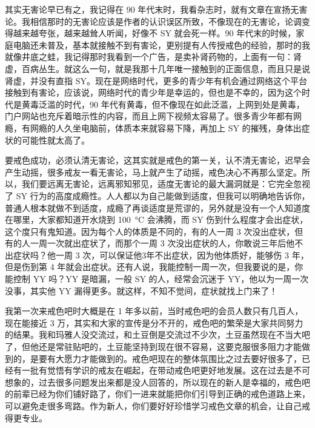 \documentclass[fontset=founder]{ctexart}
\begin{document}
其实无害论早已有之，我记得在 90 年代末时，我看杂志时，就有文章在宣扬无害论。我相信那时的无害论应该是作者的认识误区所致，不像现在的无害论，论调变得越来越夸张，越来越耸人听闻，好像不 SY 就会死一样。90 年代末的时候，家庭电脑还未普及，基本就接触不到有害论，更别提有人传授戒色的经验，那时的我就像井底之蛙，我记得那时我看到一个广告，是卖补肾药物的，上面有一句：肾虚，百病丛生。就这么一句，就是我那十几年唯一接触到的正面信息，而且只是说肾虚，并没有直指 SY。现在是网络时代，更多的青少年有机会通过网络这个平台接触到有害论，应该说，网络时代的青少年是幸运的，但也是不幸的，因为这个时代是黄毒泛滥的时代，90 年代有黄毒，但不像现在如此泛滥，上网到处是黄毒，门户网站也充斥着暗示性的内容，而且上网下视频太容易了。很多青少年都有网瘾，有网瘾的人久坐电脑前，体质本来就容易下降，再加上 SY 的摧残，身体出症状的可能性就太高了。

要戒色成功，必须认清无害论，这其实就是戒色的第一关，认不清无害论，迟早会产生动摇，很多戒友一看无害论，马上就产生了动摇，戒色决心不再那么坚定。所以，我们要远离无害论，远离邪知邪见，适度无害论的最大漏洞就是：它完全忽视了 SY 行为的高度成瘾性。人人都以为自己能做到适度，但我可以明确地告诉你，普通人根本就做不到适度，成瘾了再谈适度是荒谬的，另外就是没有一个人知道度在哪里，大家都知道开水烧到 \SI{100}{\degreeCelsius} 会沸腾，而 SY 伤到什么程度才会出症状，这个度只有鬼知道。因为每个人的体质是不同的，有的人一周 3 次没出症状，但有的人一周一次就出症状了，而那个一周 3 次没出症状的人，你敢说三年后他不出症状吗？他一周 3 次，可以保证他3年不出症状，因为他体质好，能够伤 3 年，但是伤到第 4 年就会出症状。还有人说，我能控制一周一次，但我要说的是，你能控制 YY 吗？YY 是暗漏，一般 SY 的人，经常会沉迷于 YY，他以为一周一次没事，其实他 YY 漏得更多。就这样，不知不觉间，症状就找上门来了！

我第一次来戒色吧时大概是在 1 年多以前，当时戒色吧的会员人数只有几百人，现在能接近 3 万，其实和大家的宣传是分不开的，戒色吧的繁荣是大家共同努力的结果。我和玛雅人没交流过，和土豆倒是交流过不少次，土豆虽然现在不当大吧了，但他还是常驻贴吧的，土豆能坚持到现在很不容易，这要克服很多阻力才能做到的，是要有大愿力才能做到的。戒色吧现在的整体氛围比之过去要好很多了，已经有一批有觉悟有学识的戒友在崛起，在带动戒色吧更好地发展。这在过去是不可想象的，过去很多问题发出来都是没人回答的，所以现在的新人是幸福的，戒色吧的前辈已经为你们铺好路了，你们一进来就能把你们引导到正确的戒色道路上来，可以避免走很多弯路。作为新人，你们要好好珍惜学习戒色文章的机会，让自己戒得更专业。
\end{document}
